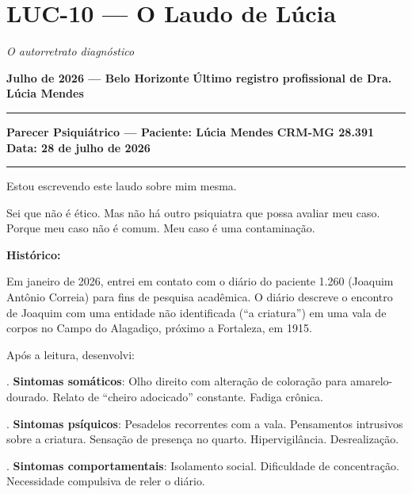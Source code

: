 \section*{\textbf{LUC-10} --- O Laudo de Lúcia}

\noindent \textit{O autorretrato diagnóstico}

\noindent \textbf{Julho de 2026 --- Belo Horizonte}
\textbf{Último registro profissional de Dra. Lúcia Mendes}

\vspace{0.5em}\noindent\rule{\textwidth}{0.5pt}\vspace{0.5em}

\noindent \textbf{Parecer Psiquiátrico --- Paciente: Lúcia Mendes}
\textbf{CRM-MG 28.391}
\textbf{Data: 28 de julho de 2026}

\vspace{0.5em}\noindent\rule{\textwidth}{0.5pt}\vspace{0.5em}

\noindent Estou escrevendo este laudo sobre mim mesma.

\noindent Sei que não é ético. Mas não há outro psiquiatra que possa avaliar meu caso. Porque meu caso não é comum. Meu caso é uma contaminação.

\noindent \textbf{Histórico:}

\noindent Em janeiro de 2026, entrei em contato com o diário do paciente 1.260 (Joaquim Antônio Correia) para fins de pesquisa acadêmica. O diário descreve o encontro de Joaquim com uma entidade não identificada (\textquotedblleft{}a criatura\textquotedblright{}) em uma vala de corpos no Campo do Alagadiço, próximo a Fortaleza, em 1915.

\noindent Após a leitura, desenvolvi:

. \textbf{Sintomas somáticos}: Olho direito com alteração de coloração para amarelo-dourado. Relato de \textquotedblleft{}cheiro adocicado\textquotedblright{} constante. Fadiga crônica.

. \textbf{Sintomas psíquicos}: Pesadelos recorrentes com a vala. Pensamentos intrusivos sobre a criatura. Sensação de presença no quarto. Hipervigilância. Desrealização.

. \textbf{Sintomas comportamentais}: Isolamento social. Dificuldade de concentração. Necessidade compulsiva de reler o diário.


